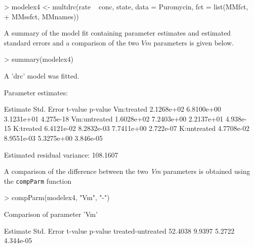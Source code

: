 \documentclass[a4paper]{article}
\begin{document}
\begin{Schunk}
\begin{Sinput}
> modelex4 <- multdrc(rate ~ conc, state, data = Puromycin, fct = list(MMfct, 
+     MMssfct, MMnames))
\end{Sinput}
\end{Schunk}
A summary of the model fit containing parameter estimates and estimated standard errors and a comparison of the two $Vm$ parameters is given below.

\begin{Schunk}
\begin{Sinput}
> summary(modelex4)
\end{Sinput}
\begin{Soutput}
A 'drc' model was fitted.

Parameter estimates:

               Estimate Std. Error    t-value   p-value
Vm:treated   2.1268e+02 6.8100e+00 3.1231e+01 4.275e-18
Vm:untreated 1.6028e+02 7.2403e+00 2.2137e+01 4.938e-15
K:treated    6.4121e-02 8.2832e-03 7.7411e+00 2.722e-07
K:untreated  4.7708e-02 8.9551e-03 5.3275e+00 3.846e-05

Estimated residual variance: 108.1607 
\end{Soutput}
\end{Schunk}
A comparison of the difference between the two \emph{Vm} parameters is obtained using the \verb+compParm+ function
\begin{Schunk}
\begin{Sinput}
> compParm(modelex4, "Vm", "-")
\end{Sinput}
\begin{Soutput}
Comparison of parameter 'Vm' 

                  Estimate Std. Error t-value   p-value
treated-untreated  52.4038     9.9397  5.2722 4.344e-05
\end{Soutput}
\end{Schunk}



\end{document}
